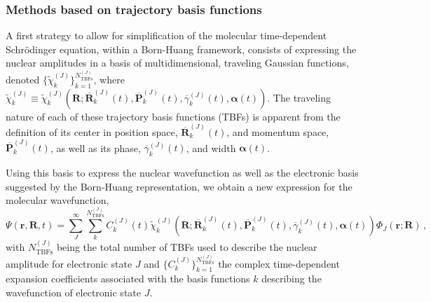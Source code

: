 \documentclass[9pt,bestpractices]{livecoms}
\newcommand{\bs}{\mathbf}
\begin{document}
\subsubsection{Methods based on trajectory basis functions}

A first strategy to allow for simplification of the molecular time-dependent Schr\"{o}dinger equation, within a Born-Huang framework, consists of expressing the nuclear amplitudes in a basis of multidimensional, traveling Gaussian functions, denoted $\{\tilde{\chi}_k^{(J)}\}_{k=1}^{N_{\text{TBFs}}^{(J)}}$, where $\tilde{\chi}_k^{(J)} \equiv \tilde{\chi}_k^{(J)}\left(\bs R;\overline{\bs R}_k^{(J)}(t),\overline{\bs P}_k^{(J)}(t),\overline{\gamma}_k^{(J)}(t),\bs \alpha(t)\right)$. The traveling nature of each of these trajectory basis functions (TBFs) is apparent from the definition of its center in position space, $\overline{\bs R}_k^{(J)}(t)$, and momentum space, $\overline{\bs P}_k^{(J)}(t)$, as well as its phase, $\overline{\gamma}_k^{(J)}(t)$, and width $\bs \alpha(t)$.

Using this basis to express the nuclear wavefunction as well as the electronic basis suggested by the Born-Huang representation, we obtain a new expression for the molecular wavefunction,
\begin{equation}
\Psi(\bs r,\bs R,t)=\sum_J^\infty \sum_k^{N_{\text{TBFs}}^{(J)}} C_k^{(J)}(t) \tilde{\chi}_k^{(J)}\left(\bs R;\overline{\bs R}_k^{(J)}(t),\overline{\bs P}_k^{(J)}(t),\overline{\gamma}_k^{(J)}(t),\bs \alpha(t)\right) \Phi_J(\bs r;\bs R) \, ,
\label{wfbasis}
\end{equation}
with $N_{\text{TBFs}}^{(J)}$ being the total number of TBFs used to describe the nuclear amplitude for electronic state $J$ and $\{C_k^{(J)}\}_{k=1}^{N_{\text{TBFs}}^{(J)}}$ the complex time-dependent expansion coefficients associated with the basis functions $k$ describing the wavefunction of electronic state $J$.
\end{document}
